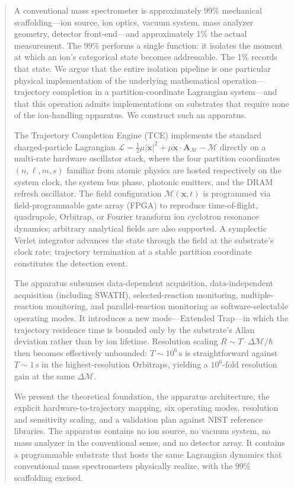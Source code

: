 \documentclass[twocolumn,11pt,a4paper]{article}
\theoremstyle{definition}
\theoremstyle{remark}
\newcommand{\Depth}{\mathcal{M}}
\newcommand{\Lagr}{\mathcal{L}}
\newcommand{\Apartition}{\mathbf{A}_{\mathcal{M}}}
\newcommand{\partinert}{\mu}
\begin{document}
\begin{abstract}
\noindent A conventional mass spectrometer is approximately 99\% mechanical scaffolding---ion source, ion optics, vacuum system, mass analyzer geometry, detector front-end---and approximately 1\% the actual measurement. The 99\% performs a single function: it isolates the moment at which an ion's categorical state becomes addressable. The 1\% records that state. We argue that the entire isolation pipeline is one particular physical implementation of the underlying mathematical operation---trajectory completion in a partition-coordinate Lagrangian system---and that this operation admits implementations on substrates that require none of the ion-handling apparatus. We construct such an apparatus.

The Trajectory Completion Engine (TCE) implements the standard charged-particle Lagrangian $\Lagr = \tfrac{1}{2}\partinert|\dot{\mathbf{x}}|^2 + \partinert\dot{\mathbf{x}} \cdot \Apartition - \Depth$ directly on a multi-rate hardware oscillator stack, where the four partition coordinates $(n, \ell, m, s)$ familiar from atomic physics are hosted respectively on the system clock, the system bus phase, photonic emitters, and the DRAM refresh oscillator. The field configuration $\Depth(\mathbf{x}, t)$ is programmed via field-programmable gate array (FPGA) to reproduce time-of-flight, quadrupole, Orbitrap, or Fourier transform ion cyclotron resonance dynamics; arbitrary analytical fields are also supported. A symplectic Verlet integrator advances the state through the field at the substrate's clock rate; trajectory termination at a stable partition coordinate constitutes the detection event.

The apparatus subsumes data-dependent acquisition, data-independent acquisition (including SWATH), selected-reaction monitoring, multiple-reaction monitoring, and parallel-reaction monitoring as software-selectable operating modes. It introduces a new mode---Extended Trap---in which the trajectory residence time is bounded only by the substrate's Allan deviation rather than by ion lifetime. Resolution scaling $R \sim T \cdot \Delta\Depth/\hbar$ then becomes effectively unbounded: $T \sim 10^6\,\mathrm{s}$ is straightforward against $T \sim 1\,\mathrm{s}$ in the highest-resolution Orbitraps, yielding a $10^6$-fold resolution gain at the same $\Delta\Depth$.

We present the theoretical foundation, the apparatus architecture, the explicit hardware-to-trajectory mapping, six operating modes, resolution and sensitivity scaling, and a validation plan against NIST reference libraries. The apparatus contains no ion source, no vacuum system, no mass analyzer in the conventional sense, and no detector array. It contains a programmable substrate that hosts the same Lagrangian dynamics that conventional mass spectrometers physically realize, with the 99\% scaffolding excised.
\end{abstract}
\end{document}
